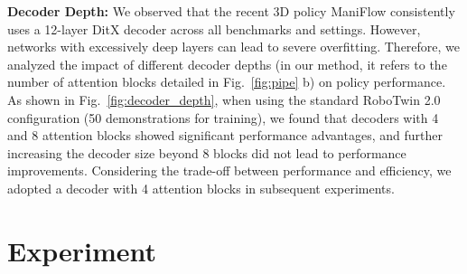 \documentclass[runningheads]{llncs}
\begin{document}
\textbf{Decoder Depth:}
We observed that the recent 3D policy ManiFlow\cite{yan2025maniflowgeneralrobotmanipulation} consistently uses a 12-layer DitX\cite{peebles2023scalable} decoder across all benchmarks and settings. However, networks with excessively deep layers can lead to severe overfitting. Therefore, we analyzed the impact of different decoder depths (in our method, it refers to the number of attention blocks detailed in Fig.~\ref{fig:pipe} b) on policy performance. As shown in Fig.~\ref{fig:decoder_depth}, when using the standard RoboTwin 2.0~\cite{chen2025robotwin} configuration (50 demonstrations for training), we found that decoders with 4 and 8 attention blocks showed significant performance advantages, and further increasing the decoder size beyond 8 blocks did not lead to performance improvements. Considering the trade-off between performance and efficiency, we adopted a decoder with 4 attention blocks in subsequent experiments. 




\section{Experiment}
\label{sec: Exp}
\end{document}
